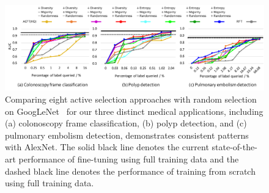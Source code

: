 \begin{figure}
\begin{center}
\includegraphics[width=1.0\columnwidth]{Figures/CH3/fig_selection_approaches_comparison_googlenet.pdf}
\end{center}
\caption[Assessment of Eight Active Selecting Criteria (GoogleNet)]{
Comparing eight active selection approaches with random selection on GoogLeNet~\citep{szegedy2015going} for our three distinct medical applications, including (a) colonoscopy frame classification, (b) polyp detection, and (c) pulmonary embolism detection, demonstrates consistent patterns with AlexNet. The solid black line denotes the current state-of-the-art performance of fine-tuning using full training data and the dashed black line denotes the performance of training from scratch using full training data.}
\label{ch3:fig:selection_approaches_comparison_googlenet}
\end{figure}



